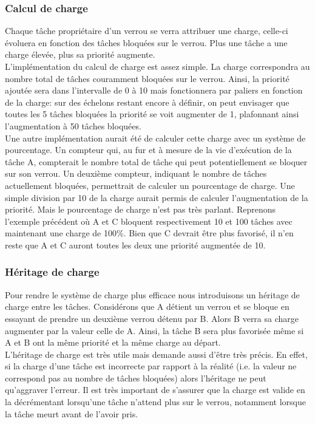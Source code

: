 \subsubsection{Calcul de charge}

Chaque tâche propriétaire d'un verrou se verra attribuer une charge, celle-ci évoluera en fonction
des tâches bloquées sur le verrou. Plus une tâche a une charge élevée, plus sa priorité augmente.
\\

L'implémentation du calcul de charge est assez simple. 
La charge correspondra au nombre total de tâches couramment bloquées sur le verrou. 
Ainsi, la priorité ajoutée sera dans l'intervalle de 0 à 10 mais fonctionnera par
paliers en fonction de la charge: sur des échelons restant encore à définir, on peut
envisager que toutes les 5 tâches bloquées la priorité se voit augmenter de 1,
plafonnant ainsi l'augmentation à 50 tâches bloquées.
\\

Une autre implémentation aurait été de calculer cette charge avec un système 
de pourcentage. Un compteur qui, au fur et à mesure de la vie d'exécution de la
tâche A, compterait le nombre total de tâche qui peut potentiellement se bloquer
sur son verrou. Un deuxième compteur, indiquant le nombre de tâches actuellement
bloquées, permettrait de calculer un pourcentage de charge. Une simple division
par 10 de la charge aurait permis de calculer l'augmentation de la priorité. Mais
le pourcentage de charge n'est pas très parlant. Reprenons l'exemple précédent
où A et C bloquent respectivement 10 et 100 tâches avec maintenant une charge 
de 100\%.
Bien que C devrait être plus favorisé, il n'en reste que A et C auront toutes 
les deux une priorité augmentée de 10.


\subsubsection{Héritage de charge}

Pour rendre le système de charge plus efficace nous introduisons un héritage
de charge entre les tâches. Considérons que A détient un verrou et se bloque
en essayant de prendre un deuxième verrou détenu par B. Alors B verra sa
charge augmenter par la valeur celle de A. Ainsi, la tâche B sera plus favorisée même
si A et B ont la même priorité et la même charge au départ.
\\

L'héritage de charge est très utile mais demande aussi d'être très précis.
En effet, si la charge d'une tâche est incorrecte par rapport à la réalité
(i.e. la valeur ne correspond pas au nombre de tâches bloquées)
alors l'héritage ne peut qu'aggraver l'erreur. Il est très important
de s'assurer que la charge est valide en la décrémentant lorsqu'une tâche 
n'attend plus sur le verrou, notamment lorsque la tâche meurt avant de l'avoir pris.


